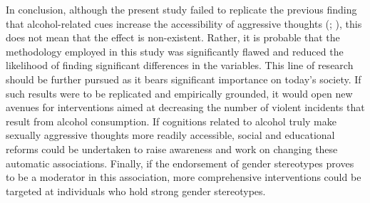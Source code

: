 \documentclass[serif, authordate, twocolumn, empirical]{jote-article}
\begin{document}
In conclusion, although the present study failed to replicate the previous finding that alcohol-related cues increase the accessibility of aggressive thoughts (; \cite{SubraMullerBegueLBushmanDelmas2010}), this does not mean that the effect is non-existent. Rather, it is probable that the methodology employed in this study was significantly flawed and reduced the likelihood of finding significant differences in the variables. This line of research should be further pursued as it bears significant importance on today’s society. If such results were to be replicated and empirically grounded, it would open new avenues for interventions aimed at decreasing the number of violent incidents that result from alcohol consumption. If cognitions related to alcohol truly make sexually aggressive thoughts more readily accessible, social and educational reforms could be undertaken to raise awareness and work on changing these automatic associations. Finally, if the endorsement of gender stereotypes proves to be a moderator in this association, more comprehensive interventions could be targeted at individuals who hold strong gender stereotypes.

\setlength{\bibhang}{\parindent}
\nocite{*} 
{}
\printbibliography




\end{document}
